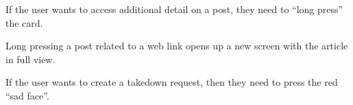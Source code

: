 \begin{minipage}{\textwidth}
  \centering
  \begin{minipage}[t]{4.6cm}
    \vspace{0pt}
    \centering
    \begin{minipage}{4.4cm}
      If the user wants to access additional detail on a post, they need to ``long press'' the card.
    \end{minipage}
  \end{minipage}
  \begin{minipage}[t]{4.6cm}
    \vspace{0pt}
    \centering
    \begin{minipage}{4.4cm}
      Long pressing a post related to a web link opens up a new screen with the article in full view.
    \end{minipage}
  \end{minipage}
  \begin{minipage}[t]{4.6cm}
    \vspace{0pt}
    \centering
    \begin{minipage}{4.4cm}
      If the user wants to create a takedown request, then they need to press the red ``sad face''.
    \end{minipage}
  \end{minipage}
\end{minipage}

